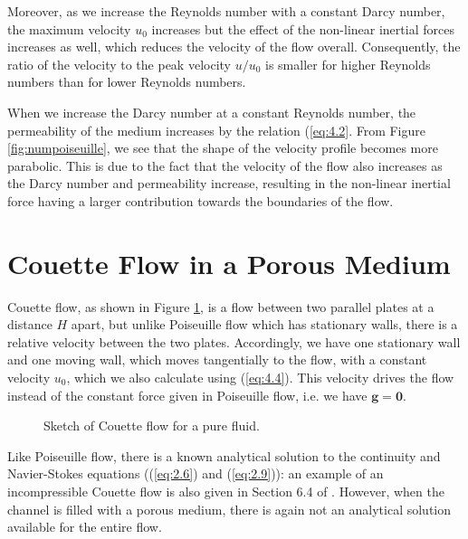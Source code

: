 \documentclass[a4paper, 11pt]{report}
\begin{document}
Moreover, as we increase the Reynolds number with a constant Darcy number, the maximum velocity $u_0$ increases but the effect of the non-linear inertial forces increases as well, which reduces the velocity of the flow overall. Consequently, the ratio of the velocity to the peak velocity $u/u_0$ is smaller for higher Reynolds numbers than for lower Reynolds numbers.

When we increase the Darcy number at a constant Reynolds number, the permeability of the medium increases by the relation (\ref{eq:4.2}. From Figure \ref{fig:numpoiseuille}, we see that the shape of the velocity profile becomes more parabolic. This is due to the fact that the velocity of the flow also increases as the Darcy number and permeability increase, resulting in the non-linear inertial force having a larger contribution towards the boundaries of the flow.

\newpage
\section{Couette Flow in a Porous Medium} \label{sec:4.3}
Couette flow, as shown in Figure \ref{fig:couette}, is a flow between two parallel plates at a distance $H$ apart, but unlike Poiseuille flow which has stationary walls, there is a relative velocity between the two plates. Accordingly, we have one stationary wall and one moving wall, which moves tangentially to the flow, with a constant velocity $u_0$, which we also calculate using (\ref{eq:4.4}). This velocity drives the flow instead of the constant force given in Poiseuille flow, i.e. we have $\mathbf{g} = \mathbf{0}$. 

\begin{figure}[!htb]
\centering

\caption{Sketch of Couette flow for a pure fluid.}
\label{fig:couette}
\end{figure}

Like Poiseuille flow, there is a known analytical solution to the continuity and Navier-Stokes equations ((\ref{eq:2.6}) and (\ref{eq:2.9})): an example of an incompressible Couette flow is also given in Section 6.4 of \cite{fmnotes}. However, when the channel is filled with a porous medium, there is again not an analytical solution available for the entire flow. 
\end{document}
